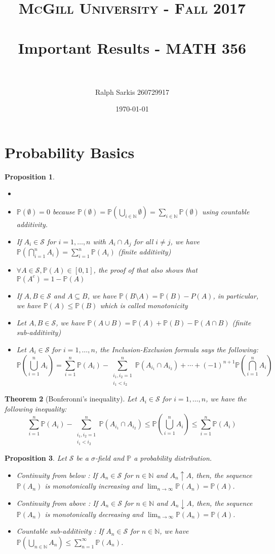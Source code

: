 \documentclass[paper=a4, fontsize=12pt]{scrartcl} %
\title{	
\normalfont \normalsize 
\textsc{McGill University - Fall 2017} \\ [0pt] %
\horrule{0.5pt} \\[0.4cm] %
\huge Important Results - MATH 356 \\ %
\horrule{2pt} \\[0cm] %
}
\author{Ralph Sarkis 260729917} %
\date{\normalsize\today} %
\newcommand{\bra}[1]{\left(#1\right)}
\newtheorem{thm}{Theorem}[section]
\newtheorem{prop}[thm]{Proposition}
\theoremstyle{definition}
\theoremstyle{remark}
\newcommand{\N}{\mathbb{N}}
\newcommand{\mS}{\mathcal{S}}
\renewcommand{\P}{\mathbb{P}}
\numberwithin{equation}{section} %
\numberwithin{figure}{section} %
\numberwithin{table}{section} %
\begin{document}
\maketitle %
\section{Probability Basics}
\begin{prop}
	\begin{itemize}
		\item[]	
		\item $\P(\emptyset) = 0$ because $\P(\emptyset) = \P\bra{\bigcup_{i \in \N} \emptyset} = \sum_{i \in \N}\P(\emptyset)$ using countable additivity.
		\item If $A_i \in \mS$ for $i = 1, \dots, n$ with $A_i \cap A_j$ for all $i \neq j$, we have $\P\bra{\bigcap_{i =1}^nA_i} = \sum_{i =1}^n \P(A_i)$ (finite additivity)
		\item $\forall A \in \mS, \P(A) \in [0,1]$, the proof of that also shows that $\P(A^c) = 1 - \P(A)$
		\item If $A, B \in \mS$ and $A \subseteq B$, we have $\P(B\setminus A) = \P(B) - P(A)$, in particular, we have $\P(A) \leq \P(B)$ which is called monotonicity
		\item Let $A,B \in \mS$, we have $\P(A \cup B) = \P(A) + \P(B) - \P(A\cap B)$ (finite sub-additivity)
		\item Let $A_i \in \mS$ for $i = 1, \dots, n$, the Inclusion-Exclusion formula says the following:
		$$\P\bra{\bigcup_{i=1}^n A_i} = \sum_{i=1}^n \P(A_i) -\sum_{\substack{i_1,i_2 = 1\\i_1<i_2}}^n \P\bra{A_{i_1} \cap A_{i_2}} + \cdots + (-1)^{n+1}\P\bra{\bigcap_{i=1}^nA_i}$$
	\end{itemize}
\end{prop}
\begin{thm}[Bonferonni's inequality]
	Let $A_i \in \mS$ for $i = 1, \dots, n$, we have the following inequality:
	\[
	\sum_{i=1}^n\P(A_i) - \sum_{\substack{i_1,i_2 = 1\\i_1<i_2}}^n \P\bra{A_{i_1} \cap A_{i_2}} \leq \P\bra{\bigcup_{i=1}^n A_i} \leq \sum_{i=1}^n\P(A_i)
	\]
\end{thm}
\begin{prop} Let $\mS$ be a $\sigma$-field and $\P$ a probability distribution.
	\begin{itemize}
		\item Continuity from below : If $A_n \in \mS$ for $n \in \N$ and $A_n \uparrow A$, then, the sequence $\P(A_n)$ is monotonically increasing and $\lim_{n\rightarrow \infty} \P(A_n) = \P(A)$.
		\item Continuity from above : If $A_n \in \mS$ for $n \in \N$ and $A_n \downarrow A$, then, the sequence $\P(A_n)$ is monotonically decreasing and $\lim_{n\rightarrow \infty} \P(A_n) = \P(A)$.
		\item Countable sub-additivity : If $A_n \in \mS$ for $n \in \N$, we have $\P\bra{\bigcup_{n \in \N}A_n} \leq \sum_{n=1}^{\infty}\P(A_n)$.
	\end{itemize}
\end{prop}
\end{document}
